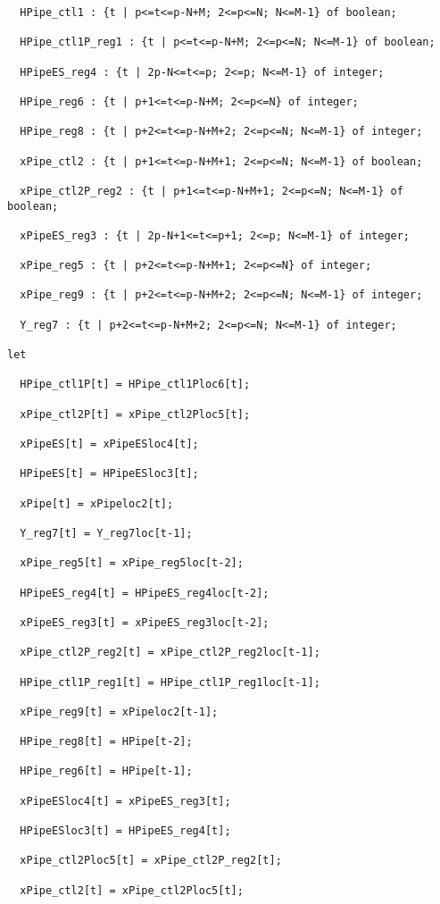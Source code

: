 \begin{verbatim}
  HPipe_ctl1 : {t | p<=t<=p-N+M; 2<=p<=N; N<=M-1} of boolean;

  HPipe_ctl1P_reg1 : {t | p<=t<=p-N+M; 2<=p<=N; N<=M-1} of boolean;

  HPipeES_reg4 : {t | 2p-N<=t<=p; 2<=p; N<=M-1} of integer;

  HPipe_reg6 : {t | p+1<=t<=p-N+M; 2<=p<=N} of integer;

  HPipe_reg8 : {t | p+2<=t<=p-N+M+2; 2<=p<=N; N<=M-1} of integer;

  xPipe_ctl2 : {t | p+1<=t<=p-N+M+1; 2<=p<=N; N<=M-1} of boolean;

  xPipe_ctl2P_reg2 : {t | p+1<=t<=p-N+M+1; 2<=p<=N; N<=M-1} of boolean;

  xPipeES_reg3 : {t | 2p-N+1<=t<=p+1; 2<=p; N<=M-1} of integer;

  xPipe_reg5 : {t | p+2<=t<=p-N+M+1; 2<=p<=N} of integer;

  xPipe_reg9 : {t | p+2<=t<=p-N+M+2; 2<=p<=N; N<=M-1} of integer;

  Y_reg7 : {t | p+2<=t<=p-N+M+2; 2<=p<=N; N<=M-1} of integer;

let

  HPipe_ctl1P[t] = HPipe_ctl1Ploc6[t];

  xPipe_ctl2P[t] = xPipe_ctl2Ploc5[t];

  xPipeES[t] = xPipeESloc4[t];

  HPipeES[t] = HPipeESloc3[t];

  xPipe[t] = xPipeloc2[t];

  Y_reg7[t] = Y_reg7loc[t-1];

  xPipe_reg5[t] = xPipe_reg5loc[t-2];

  HPipeES_reg4[t] = HPipeES_reg4loc[t-2];

  xPipeES_reg3[t] = xPipeES_reg3loc[t-2];

  xPipe_ctl2P_reg2[t] = xPipe_ctl2P_reg2loc[t-1];

  HPipe_ctl1P_reg1[t] = HPipe_ctl1P_reg1loc[t-1];

  xPipe_reg9[t] = xPipeloc2[t-1];

  HPipe_reg8[t] = HPipe[t-2];

  HPipe_reg6[t] = HPipe[t-1];

  xPipeESloc4[t] = xPipeES_reg3[t];

  HPipeESloc3[t] = HPipeES_reg4[t];

  xPipe_ctl2Ploc5[t] = xPipe_ctl2P_reg2[t];

  xPipe_ctl2[t] = xPipe_ctl2Ploc5[t];


\end{verbatim}

